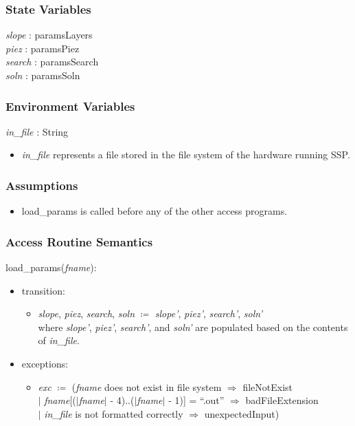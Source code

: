 \documentclass[12pt, titlepage]{article}
\newcommand{\progname}{SSP}
\begin{document}
\subsubsection{State Variables}

\textit{slope} : paramsLayers\\
\textit{piez} : paramsPiez\\
\textit{search} : paramsSearch\\
\textit{soln} : paramsSoln\\

\subsubsection{Environment Variables}

\textit{in\_file} : String
\begin{itemize}
	\item \textit{in\_file} represents a file stored in the file system of the 
	hardware running \progname{}. \\
\end{itemize}

\subsubsection{Assumptions}
\begin{itemize}
	\item load\_params is called before any of the other access programs.
\end{itemize}

\subsubsection{Access Routine Semantics}

load\_params(\textit{fname}):
\begin{itemize}
	\item transition:
	\begin{itemize}
		\item[] \textit{slope}, \textit{piez}, 
		\textit{search}, 
		\textit{soln} $\coloneqq$  \textit{slope'}, 
		\textit{piez'}, \textit{search'}, 
		\textit{soln'}\\ 
		where \textit{slope'}, 
		\textit{piez'}, \textit{search'}, and 
		\textit{soln'}
		are populated based on the contents of \textit{in\_file}.
	\end{itemize}

	\item exceptions:
	\begin{itemize}
		\item[] \textit{exc} $\coloneqq$ (\textit{fname} does not exist in file 
		system $\Rightarrow$ fileNotExist\\
		$|$ \textit{fname}[($|$\textit{fname}$|$ - 4)..($|$\textit{fname}$|$ - 
		1)] = ``.out'' $\Rightarrow$ badFileExtension\\
		$|$ \textit{in\_file} is not formatted correctly $\Rightarrow$ 
		unexpectedInput)
	\end{itemize}
\end{itemize}
\end{document}
